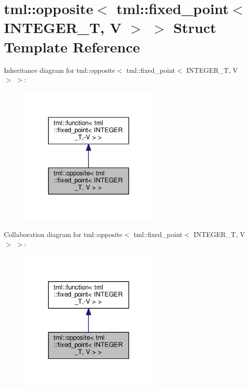 \hypertarget{structtml_1_1opposite_3_01tml_1_1fixed__point_3_01_i_n_t_e_g_e_r___t_00_01_v_01_4_01_4}{\section{tml\+:\+:opposite$<$ tml\+:\+:fixed\+\_\+point$<$ I\+N\+T\+E\+G\+E\+R\+\_\+\+T, V $>$ $>$ Struct Template Reference}
\label{structtml_1_1opposite_3_01tml_1_1fixed__point_3_01_i_n_t_e_g_e_r___t_00_01_v_01_4_01_4}
}


Inheritance diagram for tml\+:\+:opposite$<$ tml\+:\+:fixed\+\_\+point$<$ I\+N\+T\+E\+G\+E\+R\+\_\+\+T, V $>$ $>$\+:
\nopagebreak
\begin{figure}[H]
\begin{center}
\leavevmode
\includegraphics[width=202pt]{structtml_1_1opposite_3_01tml_1_1fixed__point_3_01_i_n_t_e_g_e_r___t_00_01_v_01_4_01_4__inherit__graph}
\end{center}
\end{figure}


Collaboration diagram for tml\+:\+:opposite$<$ tml\+:\+:fixed\+\_\+point$<$ I\+N\+T\+E\+G\+E\+R\+\_\+\+T, V $>$ $>$\+:
\nopagebreak
\begin{figure}[H]
\begin{center}
\leavevmode
\includegraphics[width=202pt]{structtml_1_1opposite_3_01tml_1_1fixed__point_3_01_i_n_t_e_g_e_r___t_00_01_v_01_4_01_4__coll__graph}
\end{center}
\end{figure}
